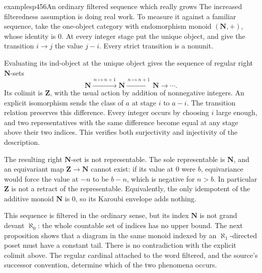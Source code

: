 \begin{dcomment}{examples}{p456}{An ordinary filtered sequence which really grows}
The increased filteredness assumption is doing real work. To measure it against a familiar sequence, take the one-object category with endomorphism monoid $(\mathbf N,+)$, whose identity is $0$. At every integer stage put the unique object, and give the transition $i\to j$ the value $j-i$. Every strict transition is a nonunit.

Evaluating its ind-object at the unique object gives the sequence of regular right $\mathbf N$-sets
\[
\mathbf N\xrightarrow{\,n\mapsto n+1\,}\mathbf N
\xrightarrow{\,n\mapsto n+1\,}\mathbf N\longrightarrow\cdots .
\]
Its colimit is $\mathbf Z$, with the usual action by addition of nonnegative integers. An explicit isomorphism sends the class of $a$ at stage $i$ to $a-i$. The transition relation preserves this difference. Every integer occurs by choosing $i$ large enough, and two representatives with the same difference become equal at any stage above their two indices. This verifies both surjectivity and injectivity of the description.

The resulting right $\mathbf N$-set is not representable. The sole representable is $\mathbf N$, and an equivariant map $\mathbf Z\to\mathbf N$ cannot exist: if its value at $0$ were $b$, equivariance would force the value at $-n$ to be $b-n$, which is negative for $n>b$. In particular $\mathbf Z$ is not a retract of the representable. Equivalently, the only idempotent of the additive monoid $\mathbf N$ is $0$, so its Karoubi envelope adds nothing.

This sequence is filtered in the ordinary sense, but its index $\mathbf N$ is not grand devant $\aleph_0$: the whole countable set of indices has no upper bound. The next proposition shows that a diagram in the same monoid indexed by an $\aleph_1$-directed poset must have a constant tail. There is no contradiction with the explicit colimit above. The regular cardinal attached to the word filtered, and the source's successor convention, determine which of the two phenomena occurs.
\end{dcomment}

